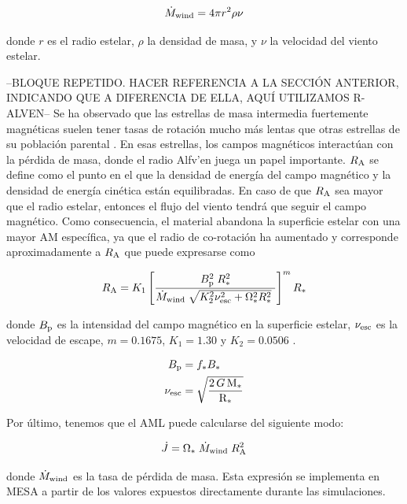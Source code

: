 \begin{ceqn}
	\begin{equation}
		\Dot{M}_{\mathrm{wind}} = 4\pi r^2\rho\nu \label{eq:mass_loss}
	\end{equation}
\end{ceqn}

donde $r$ es el radio estelar, $\rho$ la densidad de masa, y $\nu$ la velocidad del viento estelar.

--BLOQUE REPETIDO. HACER REFERENCIA A LA SECCIÓN ANTERIOR, INDICANDO QUE A DIFERENCIA DE ELLA, AQUÍ UTILIZAMOS R-ALVEN--
Se ha observado que las estrellas de masa intermedia fuertemente magnéticas suelen tener tasas de rotación mucho más lentas que otras estrellas de su población parental \cite{Mathys2006}. En esas estrellas, los campos magnéticos interactúan con la pérdida de masa, donde el radio Alfv'{e}n juega un papel importante. $R_{\mathrm{A}}$ se define como el punto en el que la densidad de energía del campo magnético y la densidad de energía cinética están equilibradas. En caso de que $R_{\mathrm{A}}$ sea mayor que el radio estelar, entonces el flujo del viento tendrá que seguir el campo magnético. Como consecuencia, el material abandona la superficie estelar con una mayor AM específica, ya que el radio de co-rotación ha aumentado y corresponde aproximadamente a $R_{\mathrm{A}}$ que puede expresarse como \cite{Matt2012}

\begin{equation}
	R_{\mathrm{A}} = K_1\left[\frac{B_{\mathrm{p}}^{2}\;R_*^{2}}{\Dot{M}_{\mathrm{wind}}\;\sqrt{K_2^2\nu_{\mathrm{esc}}^2 + \Omega_*^2R_*^{2}}\ }\right]^{m}R_*  \label{eq:mb_ralfven}
\end{equation}

donde $B_{\mathrm{p}}$ es la intensidad del campo magnético en la superficie estelar, $\nu_{\mathrm{esc}}$ es la velocidad de escape, $m = 0.1675$, $K_1 = 1.30$ y $K_2 = 0.0506$ \citep{Gallet2013}.

\begin{align}
	B_{\mathrm{p}} &= f_*B_* \label{eq:bp}\\
	\nu_{\mathrm{esc}} &= \sqrt{\frac{2\,G\,\mathrm{M}_*}{\mathrm{R}_*}} \label{eq:vesc}
\end{align}

Por último, tenemos que el AML puede calcularse del siguiente modo:

\begin{equation}
	\Dot{J} = \Omega_* \; \Dot{M}_{\mathrm{wind}} \; R_{\mathrm{A}}^{2} \label{eq:j_dot}
\end{equation}

donde $\Dot{M}_{\mathrm{wind}}$ es la tasa de pérdida de masa. Esta expresión se implementa en MESA a partir de los valores expuestos directamente durante las simulaciones.

